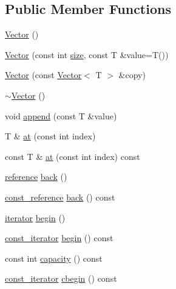 \subsection*{Public Member Functions}
\begin{DoxyCompactItemize}
\item 
\hyperlink{classprism_1_1_vector_a0081b629c0ab4d85d6847a8cf382f1af}{Vector} ()
\item 
\hyperlink{classprism_1_1_vector_a61d37ac01e42fca59cdf320804a2a7ed}{Vector} (const int \hyperlink{classprism_1_1_vector_ac6ff3296683e76da61d48bcc15e4f175}{size}, const T \&value=T())
\item 
\hyperlink{classprism_1_1_vector_a6df8c0a101ff496b688f4937ec1f13e6}{Vector} (const \hyperlink{classprism_1_1_vector}{Vector}$<$ T $>$ \&copy)
\item 
\hyperlink{classprism_1_1_vector_a80f2790bb6011dd40739bff844fd3154}{$\sim$\+Vector} ()
\item 
void \hyperlink{classprism_1_1_vector_a690b3be3b217aab2842a5b9b7b0ab4dd}{append} (const T \&value)
\item 
T \& \hyperlink{classprism_1_1_vector_ad47f765360ae83602b645afe23a65541}{at} (const int index)
\item 
const T \& \hyperlink{classprism_1_1_vector_accf072a45a5be33b09d3210df16f52d5}{at} (const int index) const 
\item 
\hyperlink{classprism_1_1_vector_a8ccf98342707efbed82918a44be97438}{reference} \hyperlink{classprism_1_1_vector_a1e19cfd05c60f96f31fb4feba79fe4eb}{back} ()
\item 
\hyperlink{classprism_1_1_vector_a75325487acaa0f63496c110e5a5632bb}{const\+\_\+reference} \hyperlink{classprism_1_1_vector_abae5f68837ada40afa65d7ff492cc79f}{back} () const 
\item 
\hyperlink{classprism_1_1_vector_aa547779173a63f6f8c9b2887498d10eb}{iterator} \hyperlink{classprism_1_1_vector_a4e1871436d85d42653eddf9cf0dac271}{begin} ()
\item 
\hyperlink{classprism_1_1_vector_acc6ed07e2d7ed5065feec92a83e46fa4}{const\+\_\+iterator} \hyperlink{classprism_1_1_vector_a4cd1ca2ba159fd073127be98b37f6ba2}{begin} () const 
\item 
const int \hyperlink{classprism_1_1_vector_aa6bfbb4672a51177c6fafbd503e90a92}{capacity} () const 
\item 
\hyperlink{classprism_1_1_vector_acc6ed07e2d7ed5065feec92a83e46fa4}{const\+\_\+iterator} \hyperlink{classprism_1_1_vector_a3cb4a9878dfd0b58b8e0a5c01f5d37f5}{cbegin} () const 

\end{DoxyCompactItemize}
